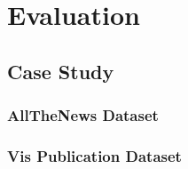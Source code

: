 \section{Evaluation}\label{sec: evaluation}
\subsection{Case Study}
\subsubsection{AllTheNews Dataset}
\subsubsection{Vis Publication Dataset}